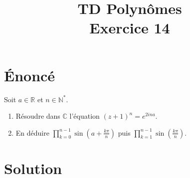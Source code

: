 \documentclass[french]{article}
\title{TD Polynômes \\ Exercice 14}
\date{}
\newcommand{\N}{\mathbb{N}}
\newcommand{\R}{\mathbb{R}}
\newcommand{\C}{\mathbb{C}}
\newcommand{\st}{^*}
\begin{document}
\maketitle

\section{Énoncé}
Soit $a\in\R$ et $n\in\N\st$.
\begin{enumerate}
	\item Résoudre dans $\C$ l'équation $(z+1)^n=e^{2ina}$.
	\item En déduire $\displaystyle\prod_{k=0}^{n-1}\sin\left(a+\frac{k\pi}{n}\right)$ puis $\displaystyle\prod_{k=1}^{n-1}\sin\left(\frac{k\pi}{n}\right)$.
\end{enumerate}
\section{Solution}
\end{document}
